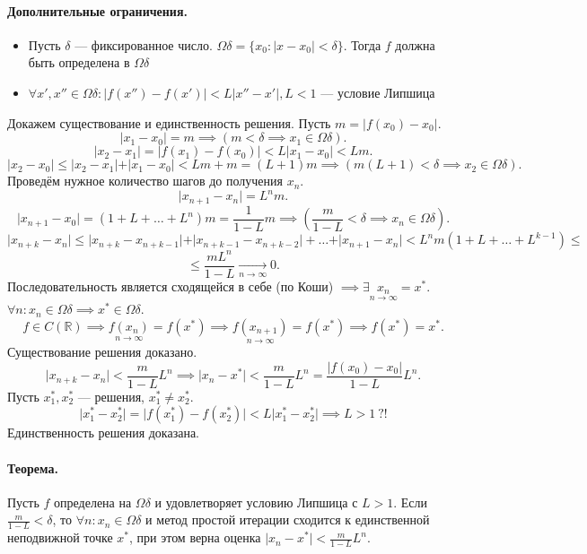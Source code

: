 \paragraph{Дополнительные ограничения.} \begin{itemize}
\item Пусть $\delta$ --- фиксированное число. $\Omega\delta = \{x_0: \vert x - x_0 \vert < \delta \}$. Тогда $f$ должна быть определена в $\Omega \delta$
\item $\forall x', x'' \in \Omega\delta: \vert f(x'') - f(x') \vert < L\vert x'' - x' \vert, L < 1$ --- условие Липшица
\end{itemize}
Докажем существование и единственность решения.
Пусть $m = \vert f(x_0) - x_0 \vert$.
\[
	\vert x_1 - x_0\vert = m \implies (m < \delta \implies x_1 \in \Omega\delta).
\]
\[
	\vert x_2 - x_1\vert = \vert f(x_1) - f(x_0) \vert < L \vert x_1 - x_0 \vert < Lm.
\]
\[
	\vert x_2 - x_0\vert \leq \vert x_2 - x_1 \vert + \vert x_1 - x_0 \vert < Lm + m = (L + 1)m \implies (m(L+1) < \delta \implies x_2 \in \Omega\delta).
\]
Проведём нужное количество шагов до получения $x_n$.
\[
	\vert x_{n+1} - x_n \vert = L^n m.
\]
\[
	\vert x_{n+1} - x_0\vert = (1+L+\hdots+L^n)m = \frac{1}{1-L}m \implies (\frac{m}{1-L} < \delta \implies x_n \in \Omega \delta).
\]
\[
	\vert x_{n+k}-x_n\vert \leq \vert x_{n+k} - x_{n+k-1}\vert + \vert x_{n+k-1} - x_{n+k-2}\vert + \hdots + \vert x_{n+1} - x_n \vert < L^n m (1+L+\hdots+L^{k-1}) \leq
\]
\[
	\leq \frac{mL^n}{1-L} \underset{n \to \infty}{\longrightarrow} 0.
\]
Последовательность является сходящейся в себе (по Коши) $\implies \exists \underset{n \to \infty}{x_n} = x^*$.
$\forall n: x_n \in \Omega\delta \implies x^* \in \Omega\delta$.
\[
	f \in C(\mathbb{R}) \implies \underset{n\to\infty}{f(x_n)}=f(x^*)\implies\underset{n\to\infty}{f(x_{n+1})}=f(x^*)\implies f(x^*)=x^*.
\]
Существование решения доказано.
\[
	\vert x_{n+k} - x_n \vert < \frac{m}{1-L}L^n\implies \vert x_n - x^*\vert < \frac{m}{1-L}L^n = \frac{\vert f(x_0)-x_0\vert}{1-L}L^n.
\]
Пусть $x_1^*, x_2^*$ --- решения, $x_1^* \neq x_2^*$.
\[
	\vert x_1^* - x_2^* \vert = \vert f(x_1^*) - f(x_2^*)\vert < L\vert x_1^* - x_2^* \vert \implies L > 1 \ ?!
\]
Единственность решения доказана.
\paragraph{Теорема.} Пусть $f$ определена на $\Omega\delta$ и удовлетворяет условию Липшица с $L > 1$. Если $\frac{m}{1-L} < \delta$, то $\forall n: x_n \in \Omega \delta$ и метод простой итерации сходится к единственной неподвижной точке $x^*$, при этом верна оценка $\vert x_n - x^*\vert < \frac {m}{1-L}L^n$.
